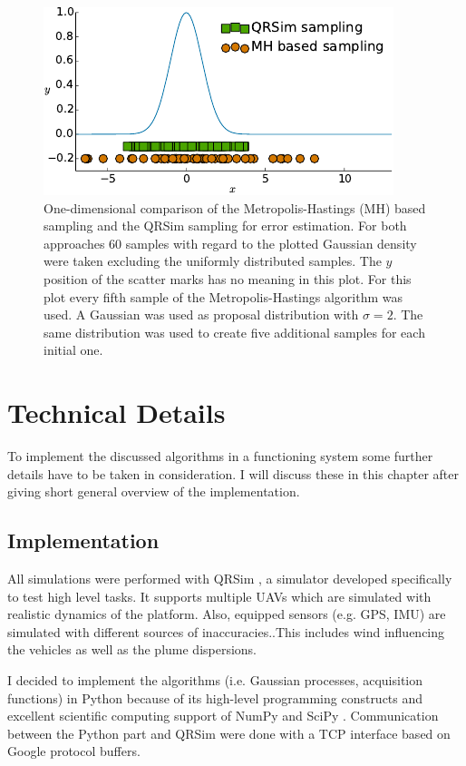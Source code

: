 \documentclass[11pt,a4paper,twoside,BCOR=15mm]{scrreprt}
\begin{document}
\begin{figure}
    \centering
    \includegraphics{plots/err-sampling}
    \caption[Comparison of error estimation sampling methods]{One-dimensional 
        comparison of the Metropolis-Hastings (MH) based sampling and the QRSim 
        sampling for error estimation. For both approaches 60 samples with 
        regard to the plotted Gaussian density were taken excluding the 
        uniformly distributed samples.  The $y$ position of the scatter marks 
        has no meaning in this plot. For this plot every fifth sample of the 
        Metropolis-Hastings algorithm was used.  A Gaussian was used as proposal 
        distribution with $\sigma = 2$.  The same distribution was used to 
        create five additional samples for each initial 
        one.}\label{fig:err-sampling}
\end{figure}

\chapter{Technical Details}
To implement the discussed algorithms in a functioning system some further 
details have to be taken in consideration. I will discuss these in this chapter 
after giving short general overview of the implementation.

\section{Implementation}
All simulations were performed with QRSim \parencite{denardi2013rn}, a simulator 
developed specifically to test high level tasks. It supports multiple UAVs which 
are simulated with realistic dynamics of the platform. Also, equipped sensors 
(e.g.  GPS, IMU) are simulated with different sources of inaccuracies..This 
includes wind influencing the vehicles as well as the plume dispersions.

I decided to implement the algorithms (i.e. Gaussian processes, acquisition 
functions) in Python because of its high-level programming constructs and 
excellent scientific computing support of NumPy and SciPy 
\parencite{Oliphant:2007dm}. Communication between the Python part and QRSim 
were done with a TCP interface based on Google protocol buffers.
\end{document}
